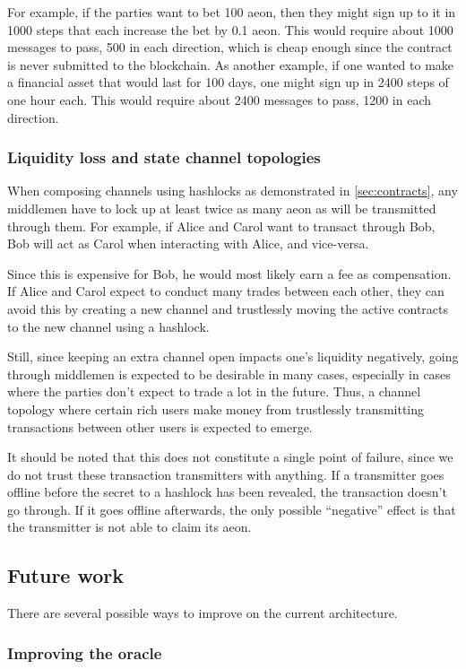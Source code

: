 \documentclass[a4paper, 10pt, conference]{ieeeconf}      %
\begin{document}
\begin{draft}
For example, if the parties want to bet 100 aeon, then they might sign up to it in 1000 steps that each increase the bet by 0.1 aeon. This would require about 1000 messages to pass, 500 in each direction, which is cheap enough since the contract is never submitted to the blockchain. As another example, if one wanted to make a financial asset that would last for 100 days, one might sign up in 2400 steps of one hour each. This would require about 2400 messages to pass, 1200 in each direction.

\subsubsection{Liquidity loss and state channel topologies}
When composing channels using hashlocks as demonstrated in \cref{sec:contracts}, any middlemen have to lock up at least twice as many aeon as will be transmitted through them. For example, if Alice and Carol want to transact through Bob, Bob will act as Carol when interacting with Alice, and vice-versa.

Since this is expensive for Bob, he would most likely earn a fee as compensation. If Alice and Carol expect to conduct many trades between each other, they can avoid this by creating a new channel and trustlessly moving the active contracts to the new channel using a hashlock.

Still, since keeping an extra channel open impacts one's liquidity negatively, going through middlemen is expected to be desirable in many cases, especially in cases where the parties don't expect to trade a lot in the future. Thus, a channel topology where certain rich users make money from trustlessly transmitting transactions between other users is expected to emerge.

It should be noted that this does not constitute a single point of failure, since we do not trust these transaction transmitters with anything. If a transmitter goes offline before the secret to a hashlock has been revealed, the transaction doesn't go through. If it goes offline afterwards, the only possible ``negative'' effect is that the transmitter is not able to claim its aeon.

\subsection{Future work}
There are several possible ways to improve on the current architecture.

\ifdraft
\subsubsection{Improving the oracle}
\fi


\end{draft}
\end{document}
